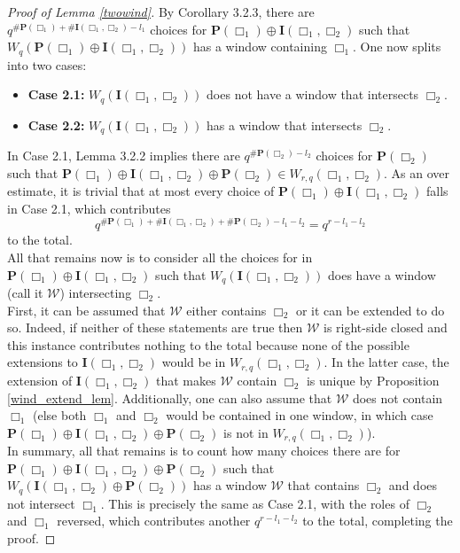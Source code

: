\documentclass{article}
\theoremstyle{definition}
\numberwithin{equation}{subsection}
\begin{document}
\begin{proof}[Proof of Lemma \ref{twowind}]
\noindent By Corollary 3.2.3, there are $q^{\#\mathbf{P}(\Box_1)+\# \mathbf{I}(\Box_1,\Box_2)-l_1}$ choices for $\mathbf{P}(\Box_1)\oplus \mathbf{I}(\Box_1,\Box_2)$ such that $W_q(\mathbf{P}(\Box_1)\oplus \mathbf{I}(\Box_1,\Box_2))$ has a window containing $\Box_1$. One now splits into two cases: \begin{itemize}
    
    \item[]\textbf{Case 2.1:} $W_q(\textbf{I}(\Box_1,\Box_2))$ does not have a window that intersects $\Box_2$.
    \item[]\textbf{Case 2.2:} $W_q(\textbf{I}(\Box_1,\Box_2))$ has a window that intersects $\Box_2$.
\end{itemize}In Case 2.1, Lemma 3.2.2 implies there are $q^{\#\mathbf{P}(\Box_2)-l_2}$ choices for $\mathbf{P}(\Box_2)$ such that $\textbf{P}(\Box_1)\oplus\textbf{I}(\Box_1,\Box_2)\oplus \mathbf{P}(\Box_2)\in W_{r,q}(\Box_1,\Box_2)$. As an over estimate, it is trivial that at most every choice of $\mathbf{P}(\Box_1)\oplus\mathbf{I}(\Box_1,\Box_2)$ falls in Case 2.1, which contributes \[q^{\#\mathbf{P}(\Box_1)+ \#\mathbf{I}(\Box_1,\Box_2)+\# \mathbf{P}(\Box_2)-l_1-l_2}=q^{r-l_1-l_2}\] to the total.\\

\noindent All that remains now is to consider all the choices for in $\textbf{P}(\Box_1)\oplus\mathbf{I}(\Box_1,\Box_2)$ such that $W_q(\mathbf{I}(\Box_1,\Box_2))$ does have a window (call it $\mathcal{W}$) intersecting $\Box_2$. \\

\noindent First, it can be assumed that $\mathcal{W}$ either contains $\Box_2$ or it can be extended to do so. Indeed, if neither of these statements are true then $\mathcal{W}$ is right-side closed and this instance contributes nothing to the total because none of the possible extensions to $\textbf{I}(\Box_1,\Box_2)$ would be in $W_{r,q}(\Box_1,\Box_2)$. In the latter case, the extension of $\textbf{I}(\Box_1,\Box_2)$ that makes $\mathcal{W}$ contain $\Box_2$ is unique by Proposition \ref{wind_extend_lem}.  Additionally, one can also assume that $\mathcal{W}$ does not contain $\Box_1$ (else both $\Box_1$ and $\Box_2$ would be contained in one window, in which case $\textbf{P}(\Box_1)\oplus\mathbf{I}(\Box_1,\Box_2)\oplus \textbf{P}(\Box_2)$ is not in $W_{r,q}(\Box_1,\Box_2)$).\\
 
 \noindent In summary, all that remains is to count how many choices there are for $\textbf{P}(\Box_1)\oplus\textbf{I}(\Box_1,\Box_2)\oplus\textbf{P}(\Box_2)$ such that $W_q(\textbf{I}(\Box_1,\Box_2)\oplus\textbf{P}(\Box_2))$ has a window $\mathcal{W}$ that contains $\Box_2$ and does not intersect $\Box_1$. This is precisely the same as Case 2.1, with the roles of $\Box_2$ and $\Box_1$ reversed, which contributes another $q^{r-l_1-l_2}$ to the total, completing the proof.



\end{proof}
\end{document}
